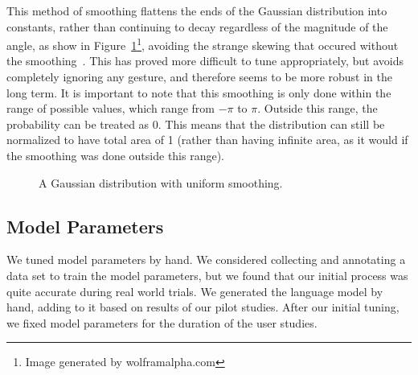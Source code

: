 \documentclass[a4paper, 11pt]{article} %
\begin{document}
This method of smoothing flattens the ends of the Gaussian distribution into constants, rather than continuing to decay regardless of the magnitude of the angle, as show in Figure~\ref{fig:gauss}\footnote{Image generated by wolframalpha.com}, avoiding the strange skewing that occured without the smoothing~\citep{thrun08}. This has proved more difficult to tune appropriately, but avoids completely ignoring any gesture, and therefore seems to be more robust in the long term. It is important to note that this smoothing is only done within the range of possible values, which range from $-\pi$ to $\pi$. Outside this range, the probability can be treated as 0. This means that the distribution can still be normalized to have total area of 1 (rather than having infinite area, as it would if the smoothing was done outside this range).
\begin{figure}[h]
\centering
{}
\caption{A Gaussian distribution with uniform smoothing.\label{fig:gauss}}
\end{figure}
\subsection{Model Parameters}
We tuned model parameters by hand. We considered collecting and annotating a data set to train the model parameters, but we found that our initial process was quite accurate during real world trials. We generated the language model by hand, adding to it based on results of our pilot studies. After our initial tuning, we fixed model parameters for the duration of the user studies. 
\end{document}
